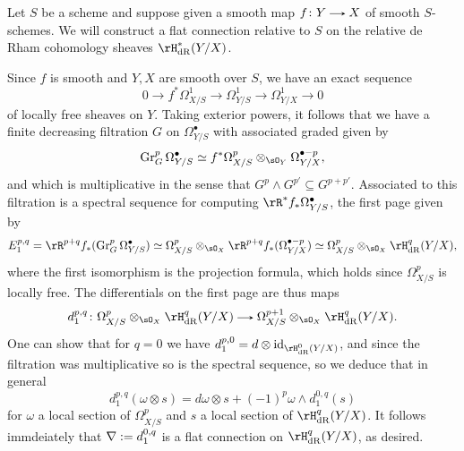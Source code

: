 \begin{construction}
  \label{gm--construction--main}
  Let $S$ be a scheme and suppose given a smooth map $f \c Y \to X$ of smooth $S$-schemes. We will construct a flat connection relative to $S$ on the relative de Rham cohomology sheaves $\rH^*_\dR(Y/X)$.

  Since $f$ is smooth and $Y,X$ are smooth over $S$, we have an exact sequence
  \[
     0 \to f^*\Omega^1_{X/S} \to \Omega^1_{Y/S} \to \Omega^1_{Y/X} \to 0
  \]
  of locally free sheaves on $Y$. Taking exterior powers, it follows that we have a finite decreasing filtration $G$ on $\Omega^\bullet_{Y/S}$ with associated graded given by
  \[
    \Gr^p_G\Omega^\bullet_{Y/S} \iso f^*\Omega^p_{X/S} \otimes_{\sO_Y} \Omega^{\bullet - p}_{Y/X},
  \]
  and which is multiplicative in the sense that $G^p \wedge G^{p'} \subseteq G^{p+p'}$. Associated to this filtration is a spectral sequence for computing $\rR^*f_*\Omega^\bullet_{Y/S}$, the first page given by
  \[
    E_1^{p,q} = \rR^{p+q}f_*(\Gr^p_G\Omega^\bullet_{Y/S}) \iso \Omega^p_{X/S} \otimes_{\sO_X} \rR^{p+q}f_*(\Omega^{\bullet - p}_{Y/X}) \iso \Omega^p_{X/S} \otimes_{\sO_X} \rH^q_\dR(Y/X),
  \]
  where the first isomorphism is the projection formula, which holds since $\Omega_{X/S}^p$ is locally free. The differentials on the first page are thus maps
  \[
    d_1^{p,q} \c \Omega^p_{X/S} \otimes_{\sO_X} \rH^q_\dR(Y/X) \to \Omega^{p+1}_{X/S} \otimes_{\sO_X} \rH^q_\dR(Y/X).
  \]
  One can show that for $q = 0$ we have $d_1^{p,0} = d \otimes \id_{\rH^0_\dR(Y/X)}$, and since the filtration was multiplicative so is the spectral sequence, so we deduce that in general
  \[
    d_1^{p,q}(\omega \otimes s) = d\omega \otimes s + (-1)^p \omega \wedge d_1^{0,q}(s)
  \]
  for $\omega$ a local section of $\Omega_{X/S}^p$ and $s$ a local section of $\rH^q_\dR(Y/X)$. It follows immdeiately that $\nabla \mathrel{:=} d_1^{0,q}$ is a flat connection on $\rH^q_\dR(Y/X)$, as desired.
\end{construction}


